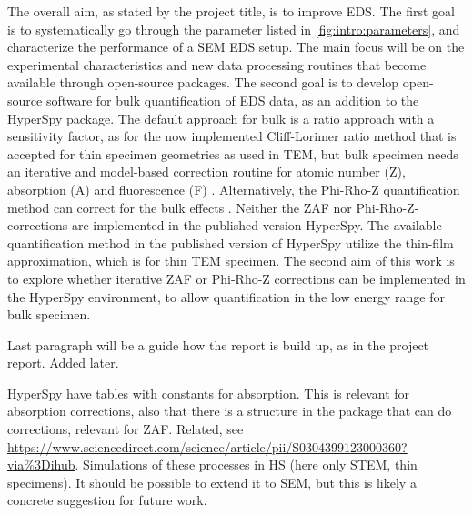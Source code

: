 The overall aim, as stated by the project title, is to improve EDS.
The first goal is to systematically go through the parameter listed in \cref{fig:intro:parameters}, and characterize the performance of a SEM EDS setup.
The main focus will be on the experimental characteristics and new data processing routines that become available through open-source packages.
The second goal is to develop open-source software for bulk quantification of EDS data, as an addition to the HyperSpy package.
The default approach for bulk is a ratio approach with a sensitivity factor, as for the now implemented Cliff-Lorimer ratio method that is accepted for thin specimen geometries as used in TEM, but bulk specimen needs an iterative and model-based correction routine for atomic number (Z), absorption (A) and fluorescence (F) \cite{goldstein_scanning_2018}.
Alternatively, the Phi-Rho-Z quantification method can correct for the bulk effects .
Neither the ZAF nor Phi-Rho-Z-corrections are implemented in the published version HyperSpy.
The available quantification method in the published version of HyperSpy utilize the thin-film approximation, which is for thin TEM specimen.
The second aim of this work is to explore whether iterative ZAF or Phi-Rho-Z corrections can be implemented in the HyperSpy environment, to allow quantification in the low energy range for bulk specimen.




Last paragraph will be a guide how the report is build up, as in the project report. Added later.


HyperSpy have tables with constants for absorption. This is relevant for absorption corrections, also that there is a structure in the package that can do corrections, relevant for ZAF.
Related, see \url{https://www.sciencedirect.com/science/article/pii/S0304399123000360?via%3Dihub}.
Simulations of these processes in HS (here only STEM, thin specimens). It should be possible to extend it to SEM, but this is likely a concrete suggestion for future work.







